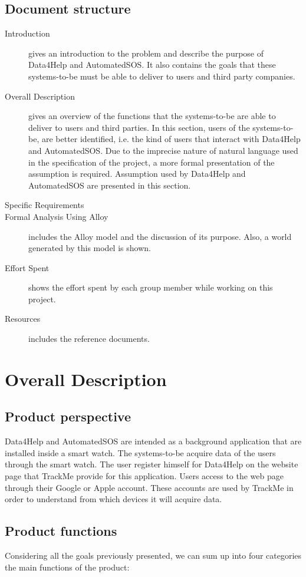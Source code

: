 \documentclass{article}
\begin{document}
\subsection{Document structure}
\begin{description}
	\item [Introduction] gives an introduction to the problem and describe the purpose of Data4Help and AutomatedSOS. It also contains the goals that these systems-to-be must be able to deliver to users and third party companies.
	\item [Overall Description] gives an overview of the functions that the systems-to-be are able to deliver to users and third parties. In this section, users of the systems-to-be, are better identified, i.e. the kind of users that interact with Data4Help and AutomatedSOS. Due to the imprecise nature of natural language used in the specification of the project, a more formal presentation of the assumption is required. Assumption used by Data4Help and AutomatedSOS are presented in this section. 
	\item [Specific Requirements]
	\item [Formal Analysis Using Alloy] includes the Alloy model and the discussion of its purpose. Also, a world generated by this model is shown.
	\item [Effort Spent] shows the effort spent by each group member while working on this project.
	\item [Resources] includes the reference documents. 
\end{description}
\section{Overall Description}
\subsection{Product perspective}
Data4Help and AutomatedSOS are intended as a background application that are installed inside a smart watch. The systems-to-be acquire data of the users through the smart watch. The user register himself for Data4Help on the website page that TrackMe provide for this application. Users access to the web page through their Google or Apple account. These accounts are used by TrackMe in order to understand from which devices it will acquire data.
\subsection{Product functions}
Considering all the goals previously presented, we can sum up into four categories the main functions of the product:
\end{document}
